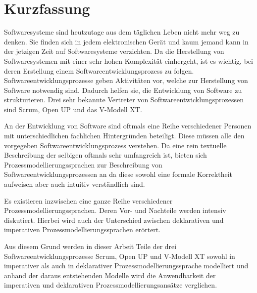 \section*{Kurzfassung}

Softwaresysteme sind heutzutage aus dem täglichen Leben nicht mehr weg zu denken. Sie finden sich in jedem elektronischen Gerät und kaum jemand kann in der jetzigen Zeit auf Softwaresysteme verzichten. Da die Herstellung von Softwaresystemen mit einer sehr hohen Komplexität einhergeht, ist es wichtig, 
bei deren Erstellung einem Softwareentwicklungsprozess zu folgen. Softwareentwicklungsprozesse geben Aktivitäten vor, welche zur Herstellung von Software notwendig sind. Dadurch helfen sie, die Entwicklung von Software zu strukturieren. Drei sehr bekannte Vertreter von Softwareentwicklungsprozessen sind Scrum, Open UP und das V-Modell XT.\newline

An der Entwicklung von Software sind oftmals eine Reihe verschiedener Personen mit unterschiedlichen fachlichen Hintergründen beteiligt. Diese müssen alle den vorgegeben Softwareentwicklungsprozess verstehen. Da eine rein textuelle Beschreibung der selbigen oftmals sehr umfangreich ist, bieten sich Prozessmodellierungssprachen zur Beschreibung von Softwareentwicklungsprozessen an da diese sowohl eine formale Korrektheit aufweisen aber auch intuitiv verständlich sind.\newline

Es existieren inzwischen eine ganze Reihe verschiedener Prozessmodellierungssprachen. Deren Vor- und Nachteile werden intensiv diskutiert. Hierbei wird auch der Unterschied zwischen deklarativen und imperativen Prozessmodellierungssprachen erörtert.\newline

Aus diesem Grund werden in dieser Arbeit Teile der drei Softwareentwicklungsprozesse Scrum, Open UP und V-Modell XT sowohl in imperativer als auch in deklarativer Prozessmodellierungssprache modelliert und anhand der daraus entstehenden Modelle wird die Anwendbarkeit der imperativen und deklarativen Prozessmodellierungsansätze verglichen.




